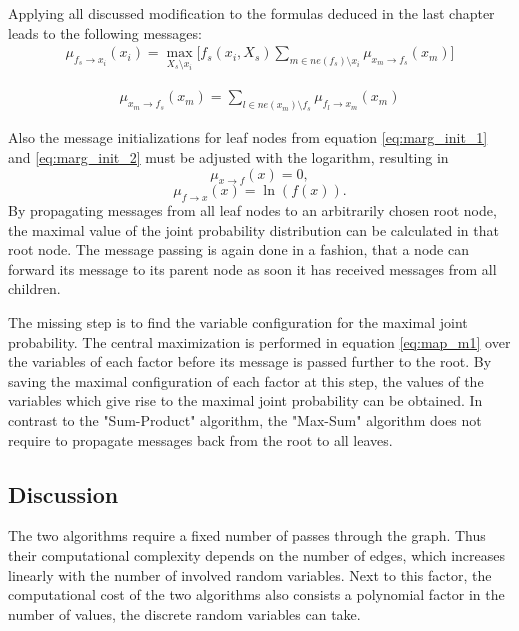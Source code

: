 \documentclass{sigkdd}
\begin{document}
Applying all discussed modification to the formulas deduced in the last chapter leads to the following messages:
\begin{equation}\label{eq:map_m1}
\begin{split}
\mu_{f_s \rightarrow x_i}(x_i) = \max_{X_s \setminus x_i} \Big[f_s(x_i, X_s) \sum_{m \in ne(f_s) \setminus x_i} \mu_{x_m \rightarrow f_s}(x_m) \Big]
\end{split}
\end{equation}

\begin{equation}\label{eq:map_m2}
\begin{split}
\mu_{x_m \rightarrow f_s}(x_m) = \sum_{l \in ne(x_m) \setminus f_s} \mu_{f_l \rightarrow x_m}(x_m)
\end{split}
\end{equation}

Also the message initializations for leaf nodes from equation \ref{eq:marg_init_1} and \ref{eq:marg_init_2} must be adjusted with the logarithm, resulting in
\begin{equation}\label{eq:marg_init2_1}
\mu_{x \rightarrow f}(x) = 0,
\end{equation}
\begin{equation}\label{eq:marg_init2_2}
\mu_{f \rightarrow x}(x) = \ln(f(x)).
\end{equation}
By propagating messages from all leaf nodes to an arbitrarily chosen root node, the maximal value of the joint probability distribution can be calculated in that root node. The message passing is again done in a fashion, that a node can forward its message to its parent node as soon it has received messages from all children.

The missing step is to find the variable configuration for the maximal joint probability. The central maximization is performed in equation \ref{eq:map_m1} over the variables of each factor before its message is passed further to the root. By saving the maximal configuration of each factor at this step, the values of the variables which give rise to the maximal joint probability can be obtained. In contrast to the "Sum-Product" algorithm, the "Max-Sum" algorithm does not require to propagate messages back from the root to all leaves.

\subsection{Discussion}
The two algorithms require a fixed number of passes through the graph. Thus their computational complexity depends on the number of edges, which increases linearly with the number of involved random variables. Next to this factor, the computational cost of the two algorithms also consists a polynomial factor in the number of values, the discrete random variables can take.
\end{document}
